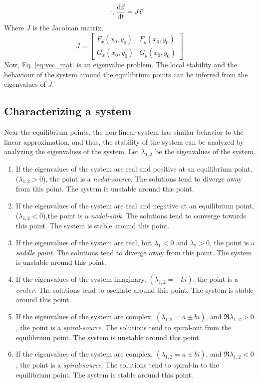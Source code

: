 \documentclass[12pt,1in]{article}
\begin{document}
\begin{align}
    \therefore \derivative{\Vec{v}}{t} &= J\Vec{v} \label{eq:vec_mat}
\end{align}
Where $J$ is the Jacobian matrix, $$J = \begin{bmatrix}
    F_x(x_0, y_0) & F_y(x_0, y_0)\\
    G_x(x_0, y_0) & G_y(x_0, y_0)
    \end{bmatrix}$$
Now, Eq. \ref{eq:vec_mat} is an eigenvalue problem. The local stability and the behaviour of the system around the equilibrium points can be inferred from the eigenvalues of $J$. 

\subsection{Characterizing a system}
Near the equilibrium points, the non-linear system has similar behavior to the linear approximation, and thus, the stability of the system can be analyzed by analyzing the eigenvalues of the system. Let $\lambda_{1,2}$ be the eigenvalues of the system.
\begin{enumerate}
	\item If the eigenvalues of the system are real and positive at an equilibrium point, ($\lambda_{1,2} > 0$), the point is a \emph{nodal-source}. The solutions tend to diverge away from this point. The system is unstable around this point. 
	\item If the eigenvalues of the system are real and negative at an equilibrium point, ($\lambda_{1,2} < 0$),the point is a \emph{nodal-sink}. The solutions tend to converge towards this point. The system is stable around this point. 
	\item If the eigenvalues of the system are real, but $\lambda_1 < 0$ and $\lambda_2 > 0$, the point is a \emph{saddle point}. The solutions tend to diverge away from this point. The system is unstable around this point.
	\item If the eigenvalues of the system imaginary, $(\lambda_{1,2} = \pm k i)$, the point is a \emph{center}.  The solutions tend to oscillate around this point. The system is stable around this point.
	\item If the eigenvalues of the system are complex, $(\lambda_{1,2} = a \pm b i)$, and $\Re{\lambda_{1,2}}> 0$, the point is a \emph{spiral-source}. The solutions tend to spiral-out from the equilibrium point. The system is unstable around this point.
	\item If the eigenvalues of the system are complex, $(\lambda_{1,2} = a \pm b i)$, and $\Re{\lambda_{1,2}}< 0$, the point is a \emph{spiral-source}. The solutions tend to spiral-in to the equilibrium point. The system is stable around this point.
\end{enumerate}
\end{document}
